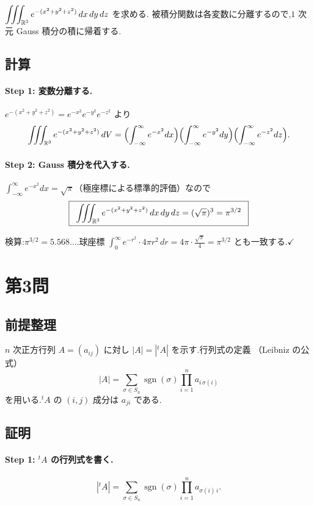 \documentclass[11pt,a4paper]{article}
\begin{document}
$\displaystyle\iiint_{\mathbb{R}^3}e^{-(x^2+y^2+z^2)}\,dx\,dy\,dz$ を求める.
被積分関数は各変数に分離するので,$1$ 次元 Gauss 積分の積に帰着する.

\subsection*{計算}

\paragraph{Step 1: 変数分離する.}
$e^{-(x^2+y^2+z^2)}=e^{-x^2}e^{-y^2}e^{-z^2}$ より
\[
\iiint_{\mathbb{R}^3}e^{-(x^2+y^2+z^2)}\,dV
=\Bigl(\int_{-\infty}^{\infty}e^{-x^2}dx\Bigr)
\Bigl(\int_{-\infty}^{\infty}e^{-y^2}dy\Bigr)
\Bigl(\int_{-\infty}^{\infty}e^{-z^2}dz\Bigr).
\]

\paragraph{Step 2: Gauss 積分を代入する.}
$\displaystyle\int_{-\infty}^{\infty}e^{-x^2}dx=\sqrt\pi$（極座標による標準的評価）なので
\[
\ans{\
\iiint_{\R^3}e^{-(x^2+y^2+z^2)}\,dx\,dy\,dz=(\sqrt\pi)^3=\pi^{3/2}\ }
\]

検算:$\pi^{3/2}=5.568\ldots$.球座標 $\int_0^\infty e^{-r^2}\cdot4\pi r^2\,dr
=4\pi\cdot\frac{\sqrt\pi}{4}=\pi^{3/2}$ とも一致する.$\checkmark$

\section*{第3問}

\subsection*{前提整理}

$n$ 次正方行列 $A=(a_{ij})$ に対し $|A|=|{}^tA|$ を示す.行列式の定義
（Leibniz の公式）
\[
|A|=\sum_{\sigma\in S_n}\operatorname{sgn}(\sigma)\prod_{i=1}^{n}a_{i\,\sigma(i)}
\]
を用いる.${}^tA$ の $(i,j)$ 成分は $a_{ji}$ である.

\subsection*{証明}

\paragraph{Step 1: ${}^tA$ の行列式を書く.}
\[
|{}^tA|=\sum_{\sigma\in S_n}\operatorname{sgn}(\sigma)\prod_{i=1}^{n}a_{\sigma(i)\,i}.
\]
\end{document}
